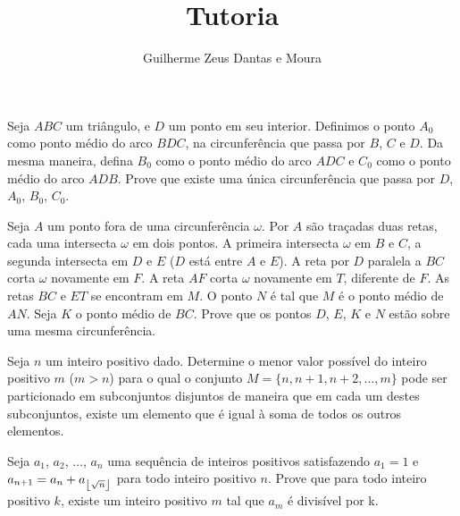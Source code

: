 \documentclass[10pt,a4paper]{article}
\title{Tutoria}
\author{Guilherme Zeus Dantas e Moura}
\begin{document}
	
 	\zeustitle

	\begin{prob}%
		Seja $ABC$ um triângulo, e $D$ um ponto em seu interior. Definimos o ponto $A_0$ como ponto médio do arco $BDC$, na circunferência que passa por $B$, $C$ e $D$. Da mesma maneira, defina $B_0$ como o ponto médio do arco $ADC$ e $C_0$ como o ponto médio do arco $ADB$. Prove que existe uma única circunferência que passa por $D$, $A_0$, $B_0$, $C_0$.
	\end{prob}

	\begin{prob}
		Seja $A$ um ponto fora de uma circunferência $\omega$. Por $A$ são traçadas duas retas, cada uma intersecta $\omega$ em dois pontos.
		A primeira intersecta $\omega$ em $B$ e $C$, a segunda intersecta em $D$ e $E$ ($D$ está entre $A$ e $E$). A reta por $D$ paralela a $BC$ corta $\omega$ novamente em $F$.
		A reta $AF$ corta $\omega$ novamente em  $T$, diferente de $F$. As retas $BC$ e $ET$ se encontram em $M$.
		O ponto $N$ é tal que $M$ é o ponto médio de $AN$. Seja $K$ o ponto médio de $BC$.
		Prove que os pontos $D$, $E$, $K$ e $N$ estão sobre uma mesma circunferência.
	\end{prob}

	\begin{prob}
		Seja $n$ um inteiro positivo dado.
		Determine o menor valor possível do inteiro positivo $m$ ($m > n$) para o qual o conjunto $M = \{n, n + 1, n + 2, \dots, m\}$ pode ser particionado em subconjuntos disjuntos de maneira que em cada um destes subconjuntos, existe um elemento que é igual à soma de todos os outros elementos.
	\end{prob}

	\begin{prob}%
		Seja $a_1$, $a_2$, $\dots$, $a_n$ uma sequência de inteiros positivos satisfazendo $a_1=1$ e $a_{n+1}=a_n+a_{\left \lfloor{\sqrt{n}}\right \rfloor}$ para todo inteiro positivo $n$. Prove que para todo inteiro positivo $k$, existe um inteiro positivo $m$ tal que $a_m$ é divisível por k.
	\end{prob}
\end{document}
